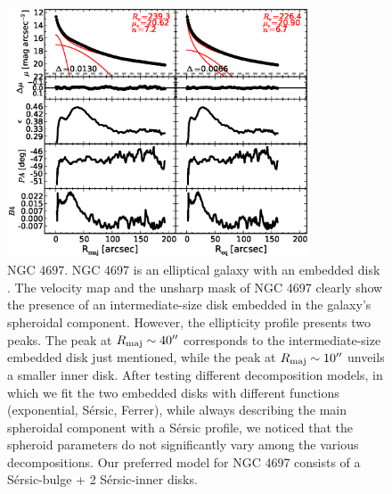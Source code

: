 \documentclass[preprint2]{emulateapj}
\newcommand{\fitfigurewidth}{0.8\textwidth}
\begin{document}
  \begin{figure}[h]
  \begin{center}
  \includegraphics[width=\fitfigurewidth]{images/n4697_1Dfit.eps}
  \caption{NGC 4697.
  NGC 4697 is an elliptical galaxy with an embedded disk \citep{scorzabender1995}.
  The velocity map and the unsharp mask of NGC 4697 clearly show 
  the presence of an intermediate-size disk embedded in the galaxy's spheroidal component.
  However, the ellipticity profile presents two peaks. 
  The peak at $R_{\rm maj} \sim 40''$ corresponds to the intermediate-size embedded disk just mentioned,
  while the peak at $R_{\rm maj} \sim 10''$ unveils a smaller inner disk.
  After testing different decomposition models, 
  in which we fit the two embedded disks with different functions (exponential, S\'ersic, Ferrer),
  while always describing the main spheroidal component with a S\'ersic profile,
  we noticed that the spheroid parameters do not significantly vary among the various decompositions.
  Our preferred model for NGC 4697 consists of a S\'ersic-bulge + 2 S\'ersic-inner disks.
  }
  \end{center}
  \end{figure}
\end{document}
